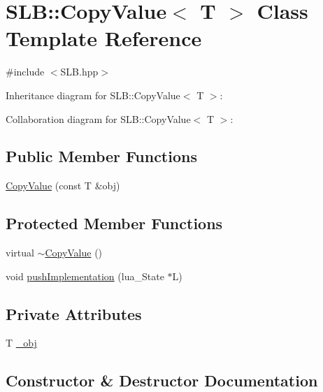 \hypertarget{classSLB_1_1CopyValue}{}\section{S\+LB\+:\+:Copy\+Value$<$ T $>$ Class Template Reference}
\label{classSLB_1_1CopyValue}


{\ttfamily \#include $<$S\+L\+B.\+hpp$>$}



Inheritance diagram for S\+LB\+:\+:Copy\+Value$<$ T $>$\+:


Collaboration diagram for S\+LB\+:\+:Copy\+Value$<$ T $>$\+:
\subsection*{Public Member Functions}
\begin{DoxyCompactItemize}
\item 
\hyperlink{classSLB_1_1CopyValue_a14094100d3dcced3707b8b0ca4043c02}{Copy\+Value} (const T \&obj)
\end{DoxyCompactItemize}
\subsection*{Protected Member Functions}
\begin{DoxyCompactItemize}
\item 
virtual \hyperlink{classSLB_1_1CopyValue_ad3670d6f249f9ce10e45ceb2f4573070}{$\sim$\+Copy\+Value} ()
\item 
void \hyperlink{classSLB_1_1CopyValue_aa00afbde7607bf64ff02b061ee470688}{push\+Implementation} (lua\+\_\+\+State $\ast$L)
\end{DoxyCompactItemize}
\subsection*{Private Attributes}
\begin{DoxyCompactItemize}
\item 
T \hyperlink{classSLB_1_1CopyValue_a439135e1afd16620e6b970e8d7df4bbe}{\+\_\+obj}
\end{DoxyCompactItemize}


\subsection{Constructor \& Destructor Documentation}
